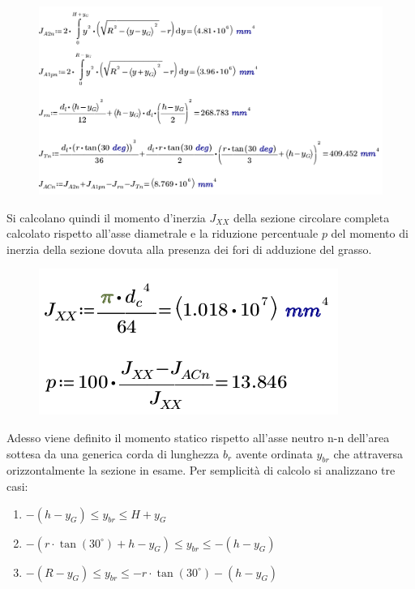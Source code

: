 \begin{figure}[H]
\centering
  \includegraphics[width=.7\textwidth]{imgs/MathAsse3}
\caption{}
\label{fig:MathAsse3}
\end{figure}
Si calcolano quindi il momento d'inerzia $J_{XX}$ della sezione circolare completa calcolato rispetto all'asse diametrale e la riduzione percentuale $p$ del momento di inerzia della sezione dovuta alla presenza dei fori di adduzione del grasso.
\begin{figure}[H]
\centering
  \includegraphics[width=.3\textwidth]{imgs/MathAsse3_1}
\caption{}
\label{fig:MathAsse3_1}
\end{figure}
Adesso viene definito il momento statico rispetto all'asse neutro n-n dell'area sottesa da una generica corda di lunghezza $b_r$ avente ordinata $y_{br}$ che attraversa orizzontalmente la sezione in esame. 
Per semplicità di calcolo si analizzano tre casi:
\begin{enumerate}
\item $-(h-y_G) \leq y_{br} \leq H+y_G$
\item $-(r \cdot \tan(30^\circ)+h-y_G) \leq y_{br} \leq -(h-y_G)$
\item $-(R-y_G) \leq y_{br} \leq -r \cdot \tan(30^\circ)-(h-y_G)$
\end{enumerate}

